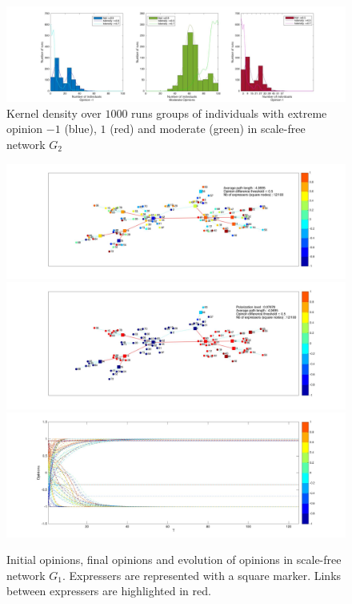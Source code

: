 \documentclass{article}
\begin{document}
\begin{figure}[]
\hspace{-2cm}
\includegraphics[scale=0.24]{img/SF_ksdensity_A6_max.jpg}
\caption{Kernel density over $1000$ runs groups of individuals with extreme opinion $-1$ (blue), $1$ (red) and moderate (green) in scale-free network $G_2$}
\label{ksdensity_A6}
\end{figure}

\begin{figure}[]
\includegraphics[scale=0.25]{img/SF_IO_A5_max.jpg}
\quad \hspace{-2cm}
\includegraphics[scale=0.25]{img/SF_FO_A5_max.jpg}
\quad
\includegraphics[scale=0.25]{img/SF_evolution_A5_max.jpg}
\caption{Initial opinions, final opinions and evolution of opinions in scale-free network $G_1$. Expressers are represented with a square marker. Links between expressers are highlighted in red.}
\label{A5_highest}
\end{figure}
\end{document}

